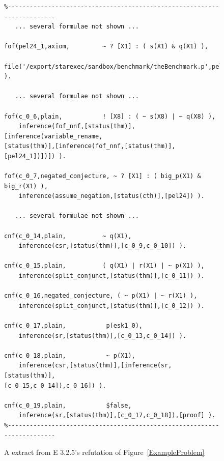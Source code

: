 \documentclass[runningheads]{llncs}
\begin{document}
\begin{figure}[htb]
\centering
{\footnotesize
{\setlength{\baselineskip}{3mm}
\begin{verbatim}
%------------------------------------------------------------------------
   ... several formulae not shown ...

fof(pel24_1,axiom,         ~ ? [X1] : ( s(X1) & q(X1) ),
    file('/export/starexec/sandbox/benchmark/theBenchmark.p',pel24_1) ).

   ... several formulae not shown ...

fof(c_0_6,plain,           ! [X8] : ( ~ s(X8) | ~ q(X8) ),
    inference(fof_nnf,[status(thm)],[inference(variable_rename,
[status(thm)],[inference(fof_nnf,[status(thm)],[pel24_1])])]) ).

fof(c_0_7,negated_conjecture, ~ ? [X1] : ( big_p(X1) & big_r(X1) ),
    inference(assume_negation,[status(cth)],[pel24]) ).

   ... several formulae not shown ...

cnf(c_0_14,plain,          ~ q(X1),
    inference(csr,[status(thm)],[c_0_9,c_0_10]) ).

cnf(c_0_15,plain,          ( q(X1) | r(X1) | ~ p(X1) ),
    inference(split_conjunct,[status(thm)],[c_0_11]) ).

cnf(c_0_16,negated_conjecture, ( ~ p(X1) | ~ r(X1) ),
    inference(split_conjunct,[status(thm)],[c_0_12]) ).

cnf(c_0_17,plain,           p(esk1_0),
    inference(sr,[status(thm)],[c_0_13,c_0_14]) ).

cnf(c_0_18,plain,           ~ p(X1),
    inference(csr,[status(thm)],[inference(sr,[status(thm)],
[c_0_15,c_0_14]),c_0_16]) ).

cnf(c_0_19,plain,           $false,
    inference(sr,[status(thm)],[c_0_17,c_0_18]),[proof] ).
%------------------------------------------------------------------------
\end{verbatim}
}}
\caption{A extract from E 3.2.5's refutation of Figure~\ref{ExampleProblem}}
\label{ExampleDerivation}
\end{figure}
\end{document}
